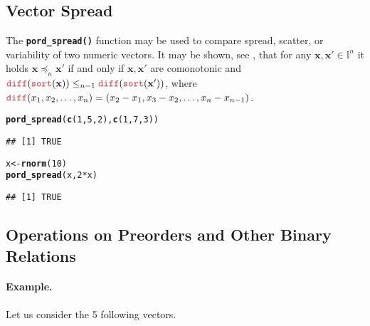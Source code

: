 \documentclass[11pt]{article}\usepackage[]{graphicx}\usepackage[]{color}
\makeatletter
\newcommand{\hlnum}[1]{\textcolor[rgb]{0.686,0.059,0.569}{#1}}%
\newcommand{\hlopt}[1]{\textcolor[rgb]{0,0,0}{#1}}%
\newcommand{\hlstd}[1]{\textcolor[rgb]{0.345,0.345,0.345}{#1}}%
\newcommand{\hlkwb}[1]{\textcolor[rgb]{0.69,0.353,0.396}{#1}}%
\newcommand{\hlkwd}[1]{\textcolor[rgb]{0.737,0.353,0.396}{\textbf{#1}}}%
\newenvironment{kframe}{%
 \def\at@end@of@kframe{}%
 \ifinner\ifhmode%
  \def\at@end@of@kframe{\end{minipage}}%
  \begin{minipage}{\columnwidth}%
 \fi\fi%
 \def\FrameCommand##1{\hskip\@totalleftmargin \hskip-\fboxsep
 \colorbox{shadecolor}{##1}\hskip-\fboxsep
     \hskip-\linewidth \hskip-\@totalleftmargin \hskip\columnwidth}%
 \MakeFramed {\advance\hsize-\width
   \@totalleftmargin\z@ \linewidth\hsize
   \@setminipage}}%
 {\par\unskip\endMakeFramed%
 \at@end@of@kframe}
\newenvironment{knitrout}{}{} %
\newcommand{\Rfunc}[1]{\texttt{\hlkwd{#1}}}
\newcommand{\vect}[1]{{\mathbf{#1}}}
\newcommand{\IvalPow}[1]{\mathbb{I}^{#1}}
\theoremstyle{remark}
\theoremstyle{definition}
\makeatother
\begin{document}

\subsection{Vector Spread}\label{Sec:VectorSpread}


The \index{\Rfunc{pord\_spread()}}\Rfunc{pord\_spread()} function
may be used to compare spread, scatter, or variability of two numeric vectors.
It may be shown, see \cite{Gagolewski2015:spread},
that for any $\vect{x},\vect{x}'\in\IvalPow{n}$
it holds $\vect{x}\preccurlyeq_n\vect{x}'$
if and only if $\vect{x},\vect{x}'$ are comonotonic
and $\Rfunc{diff}(\Rfunc{sort}(\vect{x}))\le_{n-1}\Rfunc{diff}(\Rfunc{sort}(\vect{x}'))$,
where $\text{\Rfunc{diff}}(x_1,x_2,\dots,x_n)=(x_2-x_1,x_3-x_2,\dots,x_n-x_{n-1})$.


\begin{knitrout}\small
{}\color{fgcolor}\begin{kframe}
\begin{alltt}
\hlkwd{pord_spread}\hlstd{(}\hlkwd{c}\hlstd{(}\hlnum{1}\hlstd{,} \hlnum{5}\hlstd{,} \hlnum{2}\hlstd{),} \hlkwd{c}\hlstd{(}\hlnum{1}\hlstd{,} \hlnum{7}\hlstd{,} \hlnum{3}\hlstd{))}
\end{alltt}
\begin{verbatim}
## [1] TRUE
\end{verbatim}
\begin{alltt}
\hlstd{x} \hlkwb{<-} \hlkwd{rnorm}\hlstd{(}\hlnum{10}\hlstd{)}
\hlkwd{pord_spread}\hlstd{(x,} \hlnum{2}\hlopt{*}\hlstd{x)}
\end{alltt}
\begin{verbatim}
## [1] TRUE
\end{verbatim}
\end{kframe}
\end{knitrout}



\subsection{Operations on Preorders and Other Binary Relations}

\paragraph{Example.} Let us consider the 5 following vectors.
\end{document}
